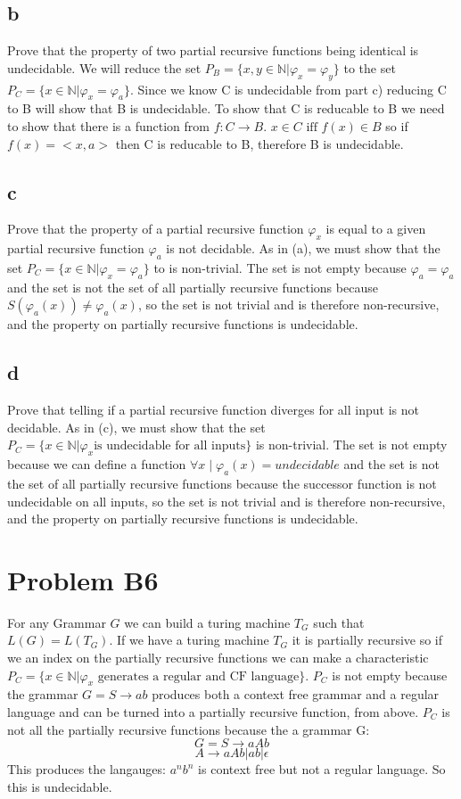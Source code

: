\documentclass[12pt]{article}
\begin{document}
\subsection*{b} 
Prove that the property of two partial recursive functions being identical is undecidable.  We will reduce the set $P_B = \{x,y \in \mathbb{N} | \varphi_x = \varphi_y\}$ to the set $P_C = \{x \in \mathbb{N} | \varphi_x = \varphi_a \}$.  Since we know C is undecidable from part c) reducing C to B will show that B is undecidable. To show that C is reducable to B  we need to show that there is a function from $f : C \rightarrow B$.  $x \in C \text{ iff } f(x) \in B$ so if $f(x) = < x , a >$ then C is reducable to B, therefore B is undecidable.
\subsection*{c} 
Prove that the property of a partial recursive function $\varphi_x$ is equal to a given partial recursive function $\varphi_a$ is not decidable.  As in (a), we must show that the set $P_C = \{x \in \mathbb{N} | \varphi_x = \varphi_a \}$ to is non-trivial.  The set is not empty because $\varphi_a = \varphi_a$ and the set is not the set of all partially recursive functions because $S (\varphi_a(x)) \neq \varphi_a(x)$, so the set is not trivial and is therefore non-recursive, and the property on partially recursive functions is undecidable.  
\subsection*{d}
Prove that telling if a partial recursive function diverges for all input is not decidable.  As in (c), we must show that the set $P_C = \{x \in \mathbb{N} | \varphi_x \text{is undecidable for all inputs} \}$ is non-trivial.  The set is not empty because we can define a function $\forall x \mid \varphi_a(x) = undecidable$ and the set is not the set of all partially recursive functions because the successor function is not undecidable on all inputs, so the set is not trivial and is therefore non-recursive, and the property on partially recursive functions is undecidable.  

\section*{Problem B6}

For any Grammar $G$ we can build a turing machine $T_G$ such that $L(G) = L(T_G)$.  If we have a turing machine $T_G$ it is partially recursive so if we an index on the partially recursive functions we can make a characteristic $P_C = \{x \in \mathbb{N} | \varphi_x \text{ generates a regular and CF language} \}$.  $P_C$ is not empty because the grammar $G = S \rightarrow ab$ produces both a context free grammar and a regular language and can be turned into a partially recursive function, from above.  $P_C$ is not all the partially recursive functions because the a grammar G:$$G = S \rightarrow aAb$$ $$A \rightarrow aAb | ab | \epsilon$$  This produces the langauges: $a^nb^n$ is context free but not a regular language.  So this is undecidable.
\end{document}
